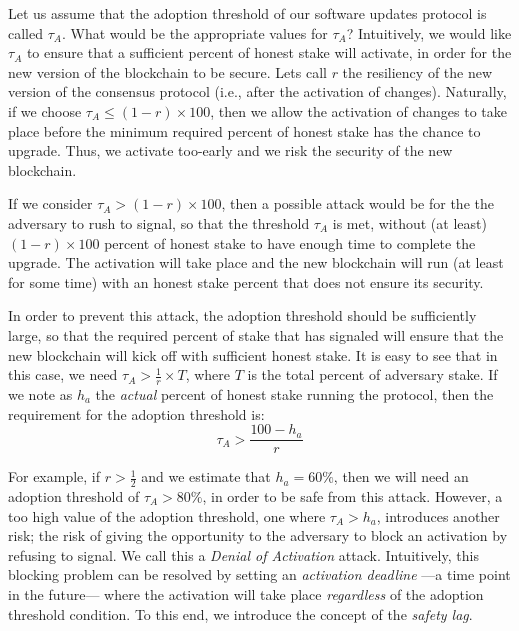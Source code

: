 Let us assume that the adoption threshold of our software updates protocol is called $\tau_A$. %
What would be the appropriate values for $\tau_A$? Intuitively, we would like $\tau_A$ to ensure that a sufficient percent of honest stake will activate, in order for the new version of the blockchain to be secure. Lets call $r$ the resiliency
 of the new version of the consensus protocol (i.e., after the activation of changes). Naturally, if we choose $\tau_A \leq (1-r)\times100$, then we allow the activation of changes to take place before the minimum required percent of honest stake has the chance to upgrade. Thus, we activate too-early and we risk the security of the new blockchain. 

If we consider $\tau_A > (1-r)\times100$, then a possible attack would be for the the adversary to rush to signal, so that the threshold $\tau_A$ is met, without (at least) $(1-r) \times 100$ percent of honest stake to have enough time to complete the upgrade. The activation will take place and the new blockchain will run (at least for some time) with an honest stake percent that does not ensure its security. 

In order to prevent this attack, the adoption threshold should be sufficiently large, so that the required percent of stake that has signaled will ensure that the new blockchain will kick off with sufficient honest stake. It is easy to see that in this case, we need $\tau_A > \frac{1}{r} \times T$, where $T$ is the total percent of adversary stake. If we note as $h_a$ the \emph{actual} percent of honest stake running the protocol, then the requirement for the adoption threshold is:
\begin{equation} \label{tauA}
\tau_A > \frac{100 - h_a}{r}
\end{equation}

For example, if $r > \frac{1}{2}$ and we estimate that $h_a = 60\%$, then we will need an adoption threshold of $\tau_A > 80\% $, in order to be safe from this attack. However, a too high value of the adoption threshold, one where $\tau_A > h_a$, introduces another risk; the risk of  giving the opportunity to the adversary to block an activation by refusing to signal. We call this a \emph{Denial of Activation} attack. Intuitively, this blocking problem can be resolved by setting an \emph{activation deadline} ---a time point in the future--- where the activation will take place \emph{regardless} of the adoption threshold condition. To this end, we introduce the concept of the \emph{safety lag}.

